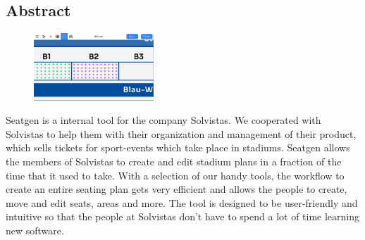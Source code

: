 \begin{spacing}{1}
    \chapter*{Abstract}
\end{spacing}
\begin{figure}
    \begin{center}
      \includegraphics[width=0.4\textwidth]{pics/abstract.png}
    \end{center}
\end{figure}
Seatgen is a internal tool for the company Solvistas. We cooperated with Solvistas to help them with their organization and management of their product, which sells tickets for sport-events which take place in stadiums. Seatgen allows the members of Solvistas to create and edit stadium plans in a fraction of the time that it used to take. With a selection of our handy tools, the workflow to create an entire seating plan gets very efficient and allows the people to create, move and edit seats, areas and more. The tool is designed to be user-friendly and intuitive so that the people at Solvistas don't have to spend a lot of time learning new software.
\newpage
